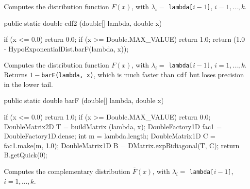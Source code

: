  \begin{tabb}
  Computes the  distribution function $F(x)$, with $\lambda_i = $
\texttt{lambda[$i-1$]}, $i = 1,\ldots,k$.
 \end{tabb}
\begin{htmlonly}
\end{htmlonly}
\begin{code}

   public static double cdf2 (double[] lambda, double x)\begin{hide} {
      if (x <= 0.0)
         return 0.0;
      if (x >= Double.MAX_VALUE)
         return 1.0;
      return (1.0 - HypoExponentialDist.barF(lambda, x));
   }\end{hide}
\end{code}
 \begin{tabb}
  Computes the  distribution function $F(x)$, with $\lambda_i = $
\texttt{lambda[$i-1$]}, $i = 1,\ldots,k$. Returns $1 - $\texttt{barF(lambda, x)},
   which is much faster than \texttt{cdf} but loses precision
   in the lower tail.
 \end{tabb}
\begin{htmlonly}
\end{htmlonly}
\begin{code}

   public static double barF (double[] lambda, double x)\begin{hide} {
      if (x <= 0.0)
         return 1.0;
      if (x >= Double.MAX_VALUE)
         return 0.0;
      DoubleMatrix2D T = buildMatrix (lambda, x);
      DoubleFactory1D fac1 = DoubleFactory1D.dense;
      int m = lambda.length;
      DoubleMatrix1D C = fac1.make(m, 1.0);
      DoubleMatrix1D B = DMatrix.expBidiagonal(T, C);
      return B.getQuick(0);
   }\end{hide}
\end{code}
  \begin{tabb}
   Computes the complementary distribution $\bar F(x)$,
   with $\lambda_i = $ \texttt{lambda[$i-1$]}, $i = 1,\ldots,k$.
 \end{tabb}
\begin{htmlonly}
\end{htmlonly}
